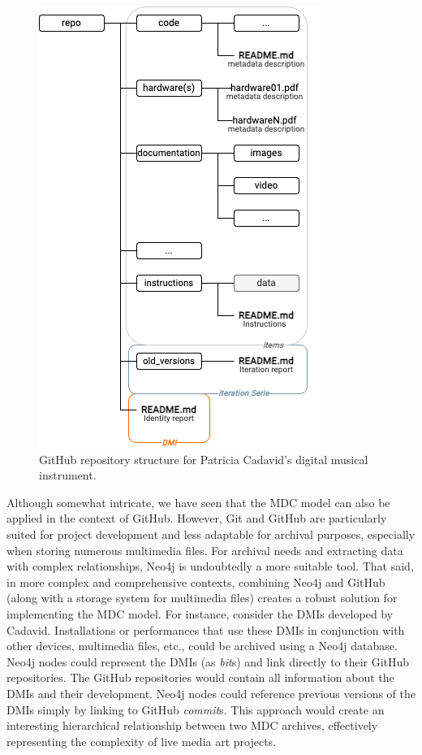 \begin{figure}[!h]
    \centering
    \includegraphics[width=0.75\linewidth]{chapters/4-MDC_model_application/image/graph04-github-template03.png}
    \caption{GitHub repository structure for Patricia Cadavid's digital musical instrument.}
    \label{fig:c4-github-template03}
\end{figure}

Although somewhat intricate, we have seen that the MDC model can also be applied in the context of GitHub. However, Git and GitHub are particularly suited for project development and less adaptable for archival purposes, especially when storing numerous multimedia files. For archival needs and extracting data with complex relationships, Neo4j is undoubtedly a more suitable tool. That said, in more complex and comprehensive contexts, combining Neo4j and GitHub (along with a storage system for multimedia files) creates a robust solution for implementing the MDC model. For instance, consider the DMIs developed by Cadavid. Installations or performances that use these DMIs in conjunction with other devices, multimedia files, etc., could be archived using a Neo4j database. Neo4j nodes could represent the DMIs (as \textit{bit}s) and link directly to their GitHub repositories. The GitHub repositories would contain all information about the DMIs and their development. Neo4j nodes could reference previous versions of the DMIs simply by linking to GitHub \textit{commit}s. This approach would create an interesting hierarchical relationship between two MDC archives, effectively representing the complexity of live media art projects.

